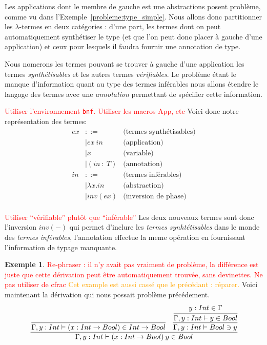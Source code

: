 \documentclass {article}
\theoremstyle{definition}
\newtheorem{example}{Exemple}
\theoremstyle{remark}
\newcommand{\todo}[1]{\textcolor{red}{#1}}
\newcommand{\attention}[1]{\textcolor{orange}{#1}}
\begin{document}
Les applications dont le membre de gauche est une abstractions posent
problème, comme vu dans l'Exemple~\ref{probleme:type_simple}.  Nous
allons donc partitionner les \(\lambda\)-termes en deux catégories :
d'une part, les termes dont on peut automatiquement synthétiser le
type (et que l'on peut donc placer à gauche d'une application) et ceux
pour lesquels il faudra fournir une annotation de type.


Nous nomerons les termes pouvant se trouver à gauche d'une application
les termes \emph{synthétisables} et les autres termes
\emph{vérifiables}.  Le problème étant le manque d'information quant
au type des termes inférables nous allons étendre le langage des
termes avec une \emph{annotation} permettant de spécifier cette
information.

\newcommand{\Inv}[1]{\ensuremath{\mathit{inv}(#1)}}
\newcommand{\Ann}[2]{\ensuremath{(#1\: :\: #2)}}

\todo{Utiliser l'environnement \texttt{bnf}. Utiliser les macros App, etc}
Voici donc notre représentation des termes:
\begin{align*}
  ex &::= & \mbox{(termes synthétisables)} \\
  &| ex\: in &\mbox{(application)} \\
  &| x &\mbox{(variable)} \\
  &| \Ann{in}{T}&\mbox{(annotation)} \\
  in &::= & \mbox{(termes inférables)} \\
  &|\lambda x.in &\mbox{(abstraction)} \\ 
  &|\Inv{ex} &\mbox{(inversion de phase)} \\
\end{align*}

\todo{Utiliser ``vérifiable'' plutôt que ``inférable''}
Les deux nouveaux termes sont donc l'inversion \Inv{-} qui permet d'inclure les 
\emph{termes synhtétisables} dans le monde des \emph{termes inférables}, l'annotation 
effectue la meme opération en fournissant l'information de typage manquante.


\begin{example}
  \todo{Re-phraser : il n'y avait pas vraiment de problème, la
    différence est juste que cette dérivation peut être
    automatiquement trouvée, sans devinettes.} \todo{Ne pas utiliser
    de cfrac} \attention{Cet example est aussi cassé que le précédant
    : réparer.} Voici maintenant la dérivation qui nous possait
  problème précédement.
  \begin{align*}
    \cfrac{
      \cfrac{
      }{\Gamma,y:Int\vdash (x:Int\rightarrow Bool) \in Int\rightarrow Bool}\:\:\:\:%
      \cfrac{
        \cfrac{y:Int \in \Gamma}{\Gamma,y:Int\vdash y \in Bool}%
      }{\Gamma,y:Int\vdash Bool \ni y}%
    }{\Gamma,y:Int\vdash \App{(x:Int\rightarrow Bool)}{y} \in Bool}%
  \end{align*}
\end{example}
\end{document}
